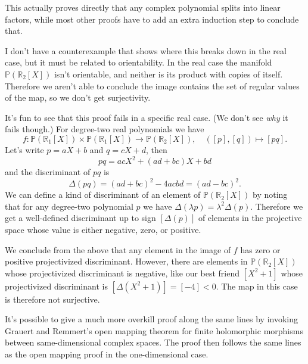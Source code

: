 \documentclass[11pt,draft]{article}
\newcommand{\kk}[1]{\mathbb{#1}}
\begin{document}
This actually proves directly that any complex polynomial splits into linear
factors, while most other proofs have to add an extra induction step to conclude
that.

I don't have a counterexample that shows where this breaks down in the
real case, but it must be related to orientability. In the real case the
manifold $\kk P(\kk R_2[X])$ isn't orientable, and neither is its product with
copies of itself. Therefore we aren't able to conclude the image contains the
set of regular values of the map, so we don't get surjectivity.


It's fun to see that this proof fails in a specific real case.
(We don't see \emph{why} it fails though.)
For degree-two real polynomials we have
\[
    f : \kk P(\kk R_1[X]) \times \kk P(\kk R_1[X])
    \to \kk P(\kk R_2[X]),
    \quad
    ([p], [q]) \mapsto [p q].
\]
Let's write $p = aX + b$ and $q = cX + d$, then
\[
    pq = ac X^2 + (ad + bc) X + bd
\]
and the discriminant of $pq$ is
\[
\Delta(pq)
= (ad + bc)^2 - 4 ac bd
= (ad - bc)^2.
\]
We can define a kind of discriminant of an element of $\kk P(\kk R_2[X])$ by
noting that for any degree-two polynomial $p$ we have $\Delta(\lambda p) =
\lambda^2 \Delta(p)$. Therefore we get a well-defined discriminant up to sign
$[\Delta(p)]$ of elements in the projective space whose value is either
negative, zero, or positive.

We conclude from the above that any element in the image of $f$ has zero or
positive projectivized discriminant.
However, there are elements in $\kk P(\kk R_2[X])$ whose projectivized
discriminant is negative, like our best friend $[X^2 + 1]$ whose projectivized
discriminant is $[\Delta(X^2 + 1)] = [-4] < 0$.
The map in this case is therefore not surjective.

It's possible to give a much more overkill proof along the same lines by
invoking Grauert and Remmert's open mapping theorem for finite holomorphic
morphisms between same-dimensional complex spaces. The proof then follows the
same lines as the open mapping proof in the one-dimen\-sion\-al case.





\end{document}
